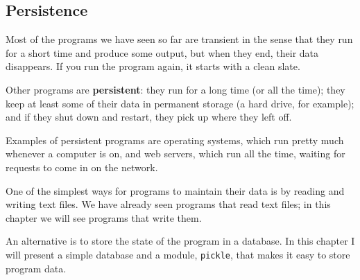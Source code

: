 \documentclass{article}
\begin{document}
\subsection{Persistence}
Most of the programs we have seen so far are transient in the sense
that they run for a short time and produce some output, but when they
end, their data disappears. If you run the program again, it starts
with a clean slate.
\par Other programs are \textbf{persistent}: they run for a long time
(or all the time);
they keep at least some of their data in permanent storage (a
hard drive, for example); and if they shut down and restart, they pick
up where they left off.
\par Examples of persistent programs are operating systems, which run
pretty much whenever a computer is on, and web servers, which run all
the time, waiting for requests to come in on the network.
\par One of the simplest ways for programs to maintain their data is by
reading and writing text files. We have already seen programs that
read text files; in this chapter we will see programs that write them.
\par An alternative is to store the state of the program in a database. In
this chapter I will present a simple database and a module,
\verb|pickle|,
that makes it easy to store program data. 
\end{document}
